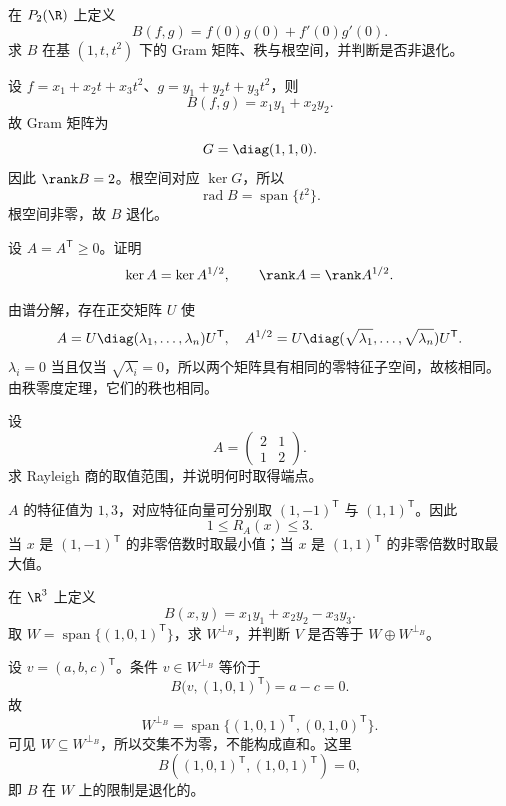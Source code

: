 \begin{exercise}[level=advanced]
在 $P_2(\R)$ 上定义
\[
B(f,g)=f(0)g(0)+f'(0)g'(0).
\]
求 $B$ 在基 $(1,t,t^2)$ 下的 Gram 矩阵、秩与根空间，并判断是否非退化。
\begin{solution}
设 $f=x_1+x_2t+x_3t^2$、$g=y_1+y_2t+y_3t^2$，则
\[
B(f,g)=x_1y_1+x_2y_2.
\]
故 Gram 矩阵为
\[
G=\diag(1,1,0).
\]
因此 $\rank B=2$。根空间对应 $\ker G$，所以
\[
\operatorname{rad}B=\operatorname{span}\{t^2\}.
\]
根空间非零，故 $B$ 退化。
\end{solution}
\end{exercise}

\begin{exercise}[level=advanced]
设 $A=A^{\mathsf T}\ge0$。证明
\[
\ker A=\ker A^{1/2},
\qquad
\rank A=\rank A^{1/2}.
\]
\begin{solution}
由谱分解，存在正交矩阵 $U$ 使
\[
A=U\diag(\lambda_1,\ldots,\lambda_n)U^{\mathsf T},
\quad
A^{1/2}=U\diag(\sqrt{\lambda_1},\ldots,\sqrt{\lambda_n})U^{\mathsf T}.
\]
$\lambda_i=0$ 当且仅当 $\sqrt{\lambda_i}=0$，所以两个矩阵具有相同的零特征子空间，故核相同。由秩零度定理，它们的秩也相同。
\end{solution}
\end{exercise}

\begin{exercise}[level=advanced]
设
\[
A=\begin{pmatrix}2&1\\1&2\end{pmatrix}.
\]
求 Rayleigh 商的取值范围，并说明何时取得端点。
\begin{solution}
$A$ 的特征值为 $1,3$，对应特征向量可分别取 $(1,-1)^{\mathsf T}$ 与 $(1,1)^{\mathsf T}$。因此
\[
1\le R_A(x)\le3.
\]
当 $x$ 是 $(1,-1)^{\mathsf T}$ 的非零倍数时取最小值；当 $x$ 是 $(1,1)^{\mathsf T}$ 的非零倍数时取最大值。
\end{solution}
\end{exercise}

\begin{exercise}[level=advanced]
在 $\R^3$ 上定义
\[
B(x,y)=x_1y_1+x_2y_2-x_3y_3.
\]
取 $W=\operatorname{span}\{(1,0,1)^{\mathsf T}\}$，求 $W^{\perp_B}$，并判断 $V$ 是否等于 $W\oplus W^{\perp_B}$。
\begin{solution}
设 $v=(a,b,c)^{\mathsf T}$。条件 $v\in W^{\perp_B}$ 等价于
\[
B\bigl(v,(1,0,1)^{\mathsf T}\bigr)=a-c=0.
\]
故
\[
W^{\perp_B}
=\operatorname{span}\{(1,0,1)^{\mathsf T},(0,1,0)^{\mathsf T}\}.
\]
可见 $W\subseteq W^{\perp_B}$，所以交集不为零，不能构成直和。这里
\[
B((1,0,1)^{\mathsf T},(1,0,1)^{\mathsf T})=0,
\]
即 $B$ 在 $W$ 上的限制是退化的。
\end{solution}
\end{exercise}

